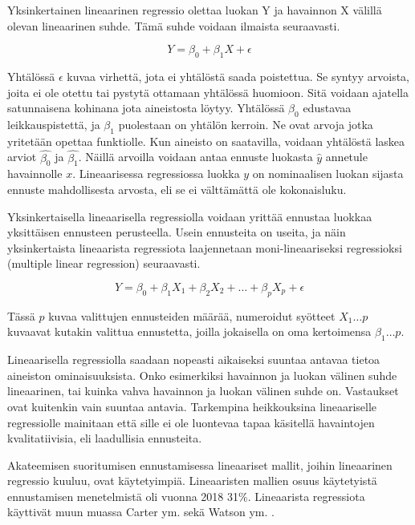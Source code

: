 \documentclass[finnish,twoside,openright]{HYgraduMLDS}
\begin{document}
Yksinkertainen lineaarinen regressio olettaa luokan Y ja havainnon X välillä olevan lineaarinen suhde. Tämä suhde voidaan ilmaista seuraavasti. 

\begin{equation} \label{eq:1}
    Y = \beta_0 + \beta_1 X + \epsilon
\end{equation}

Yhtälössä $\epsilon$ kuvaa virhettä, jota ei yhtälöstä saada poistettua. Se syntyy arvoista, joita ei ole otettu tai pystytä ottamaan yhtälössä huomioon. Sitä voidaan ajatella satunnaisena kohinana jota aineistosta löytyy. Yhtälössä $\beta_0$ edustavaa leikkauspistettä, ja $\beta_1$ puolestaan on yhtälön kerroin. Ne ovat arvoja jotka yritetään opettaa funktiolle. Kun aineisto on saatavilla, voidaan yhtälöstä laskea arviot $\hat{\beta_0}$ ja $\hat{\beta_1}$. Näillä arvoilla voidaan antaa ennuste luokasta $\hat{y}$ annetule havainnolle $x$. Lineaarisessa regressiossa luokka $y$ on nominaalisen luokan sijasta ennuste mahdollisesta arvosta, eli se ei välttämättä ole kokonaisluku.

Yksinkertaisella lineaarisella regressiolla voidaan yrittää ennustaa luokkaa yksittäisen ennusteen perusteella. Usein ennusteita on useita, ja näin yksinkertaista lineaarista regressiota laajennetaan moni-lineaariseksi regressioksi (multiple linear regression) seuraavasti.

\begin{equation} \label{eq:2}
    Y = \beta_0 + \beta_1 X_1 + \beta_2 X_2 + \dots + \beta_p X_p + \epsilon
\end{equation}

Tässä $p$ kuvaa valittujen ennusteiden määrää, numeroidut syötteet $X_1\dots p$ kuvaavat kutakin valittua ennustetta, joilla jokaisella on oma kertoimensa $\beta_1\dots p$.

Lineaarisella regressiolla saadaan nopeasti aikaiseksi suuntaa antavaa tietoa aineiston ominaisuuksista. Onko esimerkiksi havainnon ja luokan välinen suhde lineaarinen, tai kuinka vahva havainnon ja luokan välinen suhde on. Vastaukset ovat kuitenkin vain suuntaa antavia. Tarkempina heikkouksina lineaariselle regressiolle mainitaan että sille ei ole luontevaa tapaa käsitellä havaintojen kvalitatiivisia, eli laadullisia ennusteita\cite{james2013ISLR}. 

Akateemisen suoritumisen ennustamisessa lineaariset mallit, joihin lineaarinen regressio kuuluu, ovat käytetyimpiä. Lineaaristen mallien osuus käytetyistä ennustamisen menetelmistä oli vuonna 2018 31\%\cite{hellas2018predicting}. Lineaarista regressiota käyttivät muun muassa Carter ym. \cite{carter2015normalized} sekä Watson ym. \cite{watson2013predicting}.
\end{document}
